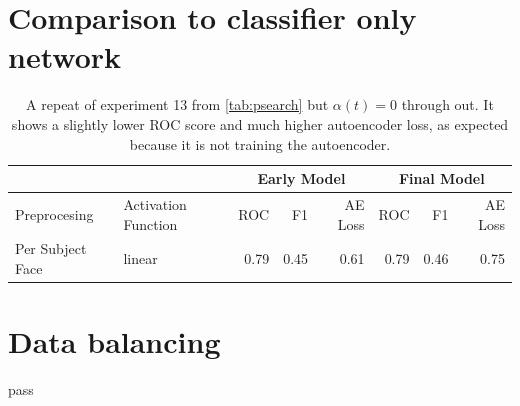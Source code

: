     \newpage
    \section{Comparison to classifier only network}
    \begin{table}[!h] {\small
      \centering
      \begin{tabular}{llrrrrrr}
         & &   \multicolumn{3}{|c|}{Early Model} &  \multicolumn{3}{c|}{Final Model}\\
         \hline
         Preprocesing       & Activation Function&  ROC    &      F1&  AE Loss & ROC     &     F1 &   AE Loss \\
         \hline
         Per Subject Face   & linear             &    0.79 &   0.45 &     0.61 &    0.79 &   0.46 &     0.75 \\
         \hline
      \end{tabular}
    \caption{A repeat of experiment 13 from \ref{tab:psearch} but $\alpha(t)=0$ through out.
    It shows a slightly lower ROC score and much higher autoencoder loss, as expected because it is not training
    the autoencoder.} \label{tab:psearchtest}}
    \end{table}

    \newpage
  \section{Data balancing}
    pass
